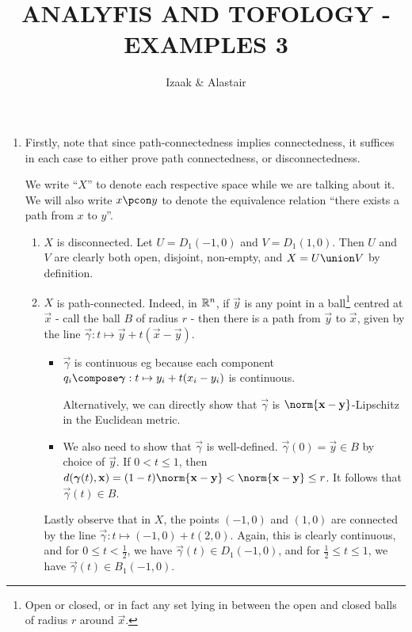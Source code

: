 \documentclass[a4paper,12pt,fleqn]{article}
\author{Izaak \& Alastair}
\title{ANALYFIS AND TOFOLOGY - EXAMPLES 3}
\begin{document}
\maketitle


\begin{enumerate}[label=\arabic*.,leftmargin=*]
 \item
  Firstly, note that since path-connectedness implies connectedness, it suffices
  in each case to either prove path connectedness, or disconnectedness.

  We write ``\(X\)'' to denote each respective space while we are talking about
  it. We will also write \(x \pcon y\) to denote the equivalence relation
  ``there exists a path from \(x\) to \(y\)''.
  \begin{enumerate}[label=(\roman*)]
   \item
    \(X\) is disconnected. Let \(U = D_1(-1, 0)\) and \(V = D_1(1, 0)\). Then
    \(U\) and \(V\) are clearly both open, disjoint, non-empty, and
    \(X = U \union V\) by definition.
   \item
    \(X\) is path-connected. Indeed, in \(\mathbb R^n\), if \(\vec y\) is any point in
    a ball\footnote{%
     Open or closed, or in fact any set lying in between the open and closed
     balls of radius \(r\) around \(\vec x\).
    } centred at \(\vec x\) - call the ball \(B\) of radius \(r\) - then there
    is a path from \(\vec y\) to \(\vec x\), given by the line
    \(\vec \gamma: t \mapsto \vec y + t(\vec x - \vec y)\).
    \begin{itemize}
     \item
      \(\vec \gamma\) is continuous eg because
      each component \(q_i \compose \vec \gamma: t \mapsto y_i + t(x_i - y_i)\)
      is continuous.

      Alternatively, we can directly show that \(\vec \gamma\) is
      \(\norm{\vec x - \vec y}\)-Lipschitz in the Euclidean metric.
     \item
      We also need to show that \(\vec \gamma\) is well-defined.
      \(\vec \gamma(0) = \vec y \in B\) by choice of \(\vec y\). If
      \(0 < t \le 1\), then
      \(d(\vec \gamma(t), \vec x)
        = (1 - t)\norm{\vec x - \vec y}
        < \norm{\vec x - \vec y}
        \le r\).
      It follows that \(\vec \gamma(t) \in B\).
    \end{itemize}
    Lastly observe that in \(X\), the points \((-1, 0)\) and \((1 ,0)\) are
    connected by the line \(\vec \gamma: t \mapsto (-1, 0) + t(2, 0)\). Again,
    this is clearly continuous, and for \(0 \le t < \tfrac 12\), we have
    \(\vec \gamma(t) \in D_1(-1, 0)\), and for \(\tfrac 12 \le t \le 1\), we
    have \(\vec \gamma(t) \in B_1(-1, 0)\).


\end{enumerate}
\end{enumerate}
\end{document}
